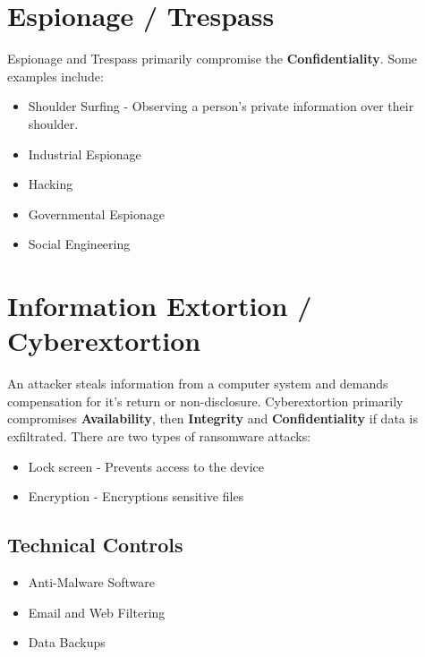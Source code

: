 \documentclass[12pt letter]{report}
\begin{document}
\section{Espionage / Trespass}



Espionage and Trespass primarily compromise the \textbf{Confidentiality}. Some examples include:
\begin{itemize}
  \item Shoulder Surfing - Observing a person's private information over their shoulder.
  \item Industrial Espionage
  \item Hacking
  \item Governmental Espionage
  \item Social Engineering
\end{itemize}

\section{Information Extortion / Cyberextortion}

An attacker steals information from a computer system and demands compensation for it's return or non-disclosure. Cyberextortion primarily compromises \textbf{Availability}, then \textbf{Integrity} and \textbf{Confidentiality} if data is exfiltrated. There are two types of ransomware attacks:
\begin{itemize}
  \item Lock screen - Prevents access to the device
  \item Encryption - Encryptions sensitive files
\end{itemize}


\subsection{Technical Controls}
\begin{itemize}
  \item Anti-Malware Software
  \item Email and Web Filtering
  \item Data Backups
\end{itemize}
\end{document}
